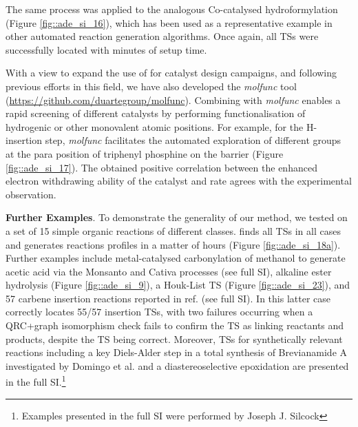 \documentclass[../../main.tex]{subfiles}
\begin{document}
The same process was applied to the analogous Co-catalysed hydroformylation (Figure \ref{fig::ade_si_16}), which has been used as a representative example in other automated reaction generation algorithms.\cite{Kim2018, Habershon2016, Maeda2012} Once again, all TSs were successfully located with minutes of setup time. 

With a view to expand the use of \ade for catalyst design campaigns, and following previous efforts in this field,\cite{Guan2018} we have also developed the \emph{molfunc} tool \\
({\url{https://github.com/duartegroup/molfunc}}). Combining \ade with \emph{molfunc} enables a rapid screening of different catalysts by performing functionalisation of hydrogenic or other monovalent atomic positions. For example, for the H-insertion step, \emph{molfunc} facilitates the automated exploration of different groups at the para position of triphenyl phosphine on the barrier (Figure \ref{fig::ade_si_17}). The obtained positive correlation between the enhanced electron withdrawing ability of the catalyst and rate agrees with the experimental observation.\cite{Kegl2015} 


{\bfseries{Further Examples}}. To demonstrate the generality of our method, we tested \ade on a set of 15 simple organic reactions of different classes. \ade finds all TSs in all cases and generates reactions profiles in a matter of hours (Figure \ref{fig::ade_si_18a}). Further examples include metal-catalysed carbonylation of methanol to generate acetic acid via the Monsanto and Cativa processes (see full SI),\cite{Jones2000} alkaline ester hydrolysis (Figure \ref{fig::ade_si_9}), a Houk-List TS (Figure \ref{fig::ade_si_23}),\cite{Armstrong2014} and 57 carbene insertion reactions reported in ref. \cite{Mieusset2008} (see full SI). In this latter case \ade correctly locates 55/57 insertion TSs, with two failures occurring when a QRC+graph isomorphism check fails to confirm the TS as linking reactants and products, despite the TS being correct. Moreover, TSs for synthetically relevant reactions including a key Diels-Alder step in a total synthesis of Brevianamide A investigated by Domingo et al.\cite{Domingo1997} and a diastereoselective epoxidation\cite{Schneebeli2009} are presented in the full SI.\footnote{Examples presented in the full SI were performed by Joseph J. Silcock}
\end{document}
